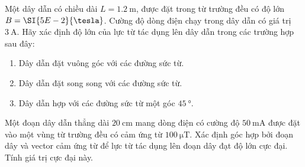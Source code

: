 \begin{ex}
	Một dây dẫn có chiều dài $L=\SI{1.2}{\meter}$, được đặt trong từ trường đều có độ lớn $B=\SI{5E-2}{\tesla}$. Cường độ dòng điện chạy trong dây dẫn có giá trị $\SI{3}{\ampere}$. Hãy xác định độ lớn của lực từ tác dụng lên dây dẫn trong các trường hợp sau đây:
	\begin{enumerate}[label=\alph*)]
		\item Dây dẫn đặt vuông góc với các đường sức từ.
		\item Dây dẫn đặt song song với các đường sức từ.
		\item Dây dẫn hợp với các đường sức từ một góc $\SI{45}{\degree}$.
	\end{enumerate}	
\end{ex}
\begin{ex}
Một đoạn dây dẫn thẳng dài $\SI{20}{\centi\meter}$ mang dòng điện có cường độ $\SI{50}{\milli\ampere}$ được đặt vào một vùng từ trường đều có cảm ứng từ $\SI{100}{\micro\tesla}$. Xác định góc hợp bởi đoạn dây và vector cảm ứng từ để lực từ tác dụng lên đoạn dây đạt độ lớn cực đại. Tính giá trị cực đại này.	
\end{ex}

